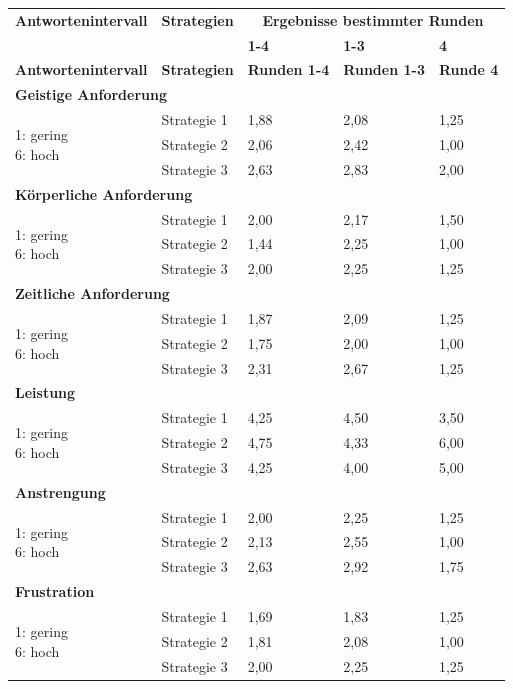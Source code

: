 \documentclass[12pt,a4paper]{scrartcl}
\begin{document}
\begin{longtable}{|p{4cm}|p{2cm}|p{2cm}|p{2cm}|p{2cm}|}
	\hline
		\textbf{Antwortenintervall}&\textbf{Strategien}&\multicolumn{3}{c|}{\textbf{Ergebnisse bestimmter Runden}}\\
	&&\textbf{1-4}&\textbf{1-3} &\textbf{4}\\
	\hline
	\endfirsthead
	\hline
	\textbf{Antwortenintervall}&\textbf{Strategien}&\textbf{Runden 1-4}&\textbf{Runden 1-3} &\textbf{Runde 4}\\
	\hline
	\endhead
		\multicolumn{5}{l}{\textbf{Geistige Anforderung}}\\
		\hline
\multirow{3}{4cm}{1: gering \newline 6: hoch} & Strategie 1 &  1,88 & 2,08 & 1,25 \\
 & Strategie 2 & 2,06 & 2,42 & 1,00\\
 & Strategie 3 & 2,63 & 2,83 & 2,00 \\
\hline
		\multicolumn{5}{l}{\textbf{Körperliche Anforderung}}\\
		\hline
\multirow{3}{4cm}{1: gering \newline 6: hoch} & Strategie 1 & 2,00 & 2,17 & 1,50 \\
 & Strategie 2 & 1,44 & 2,25 & 1,00 \\
 & Strategie 3 & 2,00 & 2,25 & 1,25 \\
\hline
		\multicolumn{5}{l}{\textbf{Zeitliche Anforderung}}\\
		\hline
\multirow{3}{4cm}{1: gering \newline 6: hoch} & Strategie 1 & 1,87 & 2,09 & 1,25 \\
 & Strategie 2 & 1,75 & 2,00 & 1,00 \\
 & Strategie 3 & 2,31 & 2,67 & 1,25 \\
\hline
		\multicolumn{5}{l}{\textbf{Leistung}}\\
		\hline
\multirow{3}{4cm}{1: gering \newline 6: hoch} & Strategie 1 & 4,25 & 4,50 & 3,50 \\
 & Strategie 2 & 4,75 & 4,33 & 6,00 \\
 & Strategie 3 & 4,25 & 4,00 & 5,00 \\
\hline
		\multicolumn{5}{l}{\textbf{Anstrengung}}\\
		\hline
\multirow{3}{4cm}{1: gering \newline 6: hoch} & Strategie 1 & 2,00 & 2,25 & 1,25 \\
 & Strategie 2 & 2,13 & 2,55 & 1,00 \\
 & Strategie 3 & 2,63 & 2,92 & 1,75\\
\hline
		\multicolumn{5}{l}{\textbf{Frustration}}\\
		\hline
\multirow{3}{4cm}{1: gering \newline 6: hoch} & Strategie 1 & 1,69 & 1,83 & 1,25 \\
 & Strategie 2 & 1,81 & 2,08 & 1,00 \\
 & Strategie 3 & 2,00 & 2,25 & 1,25 \\
\hline
\end{longtable}
\end{document}
